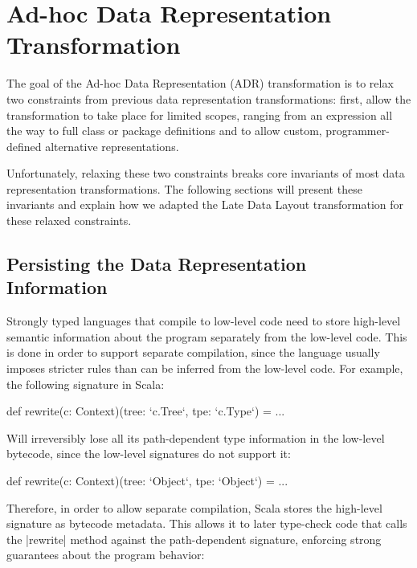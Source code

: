 \section{Ad-hoc Data Representation Transformation}
\label{sec:ildl}

The goal of the Ad-hoc Data Representation (ADR) transformation is to relax two constraints from previous data representation transformations: first, allow the transformation to take place for limited scopes, ranging from an expression all the way to full class or package definitions and to allow custom, programmer-defined alternative representations.

Unfortunately, relaxing these two constraints breaks core invariants of most data representation transformations. The following sections will present these invariants and explain how we adapted the Late Data Layout transformation for these relaxed constraints.

\subsection{Persisting the Data Representation Information}
\label{sec:ildl:signatures}

Strongly typed languages that compile to low-level code need to store high-level semantic information about the program separately from the low-level code. This is done in order to support separate compilation, since the language usually imposes stricter rules than can be inferred from the low-level code. For example, the following signature in Scala:

\begin{lstlisting-nobreak}
def rewrite(c: Context)(tree: `c.Tree`, tpe: `c.Type`) = ...
\end{lstlisting-nobreak}

Will irreversibly lose all its path-dependent type information in the low-level bytecode, since the low-level signatures do not support it:

\begin{lstlisting-nobreak}
def rewrite(c: Context)(tree: `Object`, tpe: `Object`) = ...
\end{lstlisting-nobreak}

Therefore, in order to allow separate compilation, Scala stores the high-level signature as bytecode metadata. This allows it to later type-check code that calls the |rewrite| method against the path-dependent signature, enforcing strong guarantees about the program behavior:

